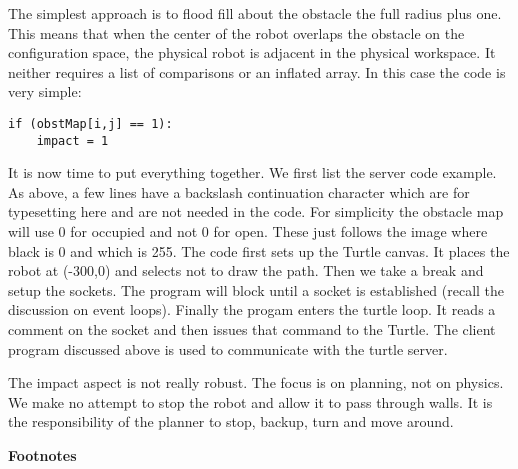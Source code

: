 The simplest approach is to flood fill about the obstacle the full
radius plus one. This means that when the center of the robot overlaps
the obstacle on the configuration space, the physical robot is adjacent
in the physical workspace. It neither requires a list of comparisons or
an inflated array. In this case the code is very simple:

\begin{verbatim}
if (obstMap[i,j] == 1):
    impact = 1
\end{verbatim}

It is now time to put everything together. We first list the server code
example. As above, a few lines have a backslash continuation character
which are for typesetting here and are not needed in the code. For
simplicity the obstacle map will use 0 for occupied and not 0 for open.
These just follows the image where black is 0 and which is 255. The code
first sets up the Turtle canvas. It places the robot at (-300,0) and
selects not to draw the path. Then we take a break and setup the
sockets. The program will block until a socket is established (recall
the discussion on event loops). Finally the progam enters the turtle
loop. It reads a comment on the socket and then issues that command to
the Turtle. The client program discussed above is used to communicate
with the turtle server.

The impact aspect is not really robust. The focus is on planning, not on
physics. We make no attempt to stop the robot and allow it to pass
through walls. It is the responsibility of the planner to stop, backup,
turn and move around.

\textbf{Footnotes}
